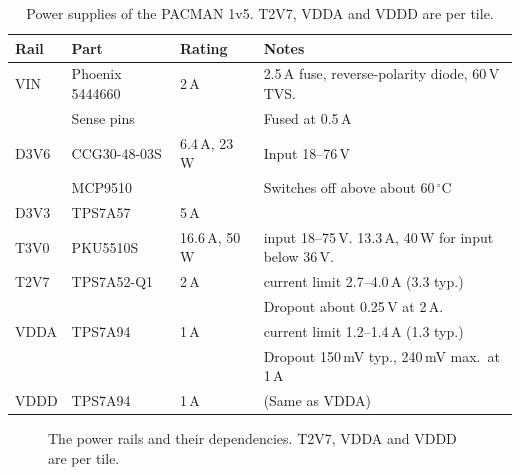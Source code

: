 \documentclass[12pt]{article}
\begin{document}
\begin{table}[htbp]
\caption{\label{tbl:hw-power} Power supplies of the PACMAN 1v5.  T2V7, VDDA and VDDD are per tile.}
\begin{center}
\begin{tabular}{llll}
Rail   & Part                 & Rating   & Notes \\
\hline
VIN    & Phoenix 5444660      & 2\,A           & 2.5\,A fuse, reverse-polarity diode, 60\,V TVS.\\
       & Sense pins           &                & Fused at 0.5\,A \\
D3V6   & CCG30-48-03S         & 6.4\,A, 23\,W  & Input 18--76\,V \\
       & MCP9510              &                & Switches off above about 60\,$^\circ$C\\
D3V3   & TPS7A57              & 5\,A           & \\
T3V0   & PKU5510S             & 16.6\,A, 50\,W & input 18--75\,V.  13.3\,A, 40\,W for input below 36\,V.   \\
T2V7   & TPS7A52-Q1           & 2\,A           & current limit 2.7--4.0\,A (3.3 typ.)\\
       &                      &                & Dropout about 0.25\,V at 2\,A.\\
VDDA   & TPS7A94              & 1\,A           & current limit 1.2--1.4\,A (1.3 typ.) \\
       &                      &                & Dropout 150\,mV typ., 240\,mV max.\ at 1\,A \\
VDDD   & TPS7A94              & 1\,A           & (Same as VDDA) \\
\end{tabular}
\end{center}
\end{table}

\begin{figure}[htbp]
  \centering
  \caption{\label{fig:hw-rails} The power rails and their dependencies.  T2V7, VDDA and VDDD are per tile.}
\end{figure}
\end{document}
